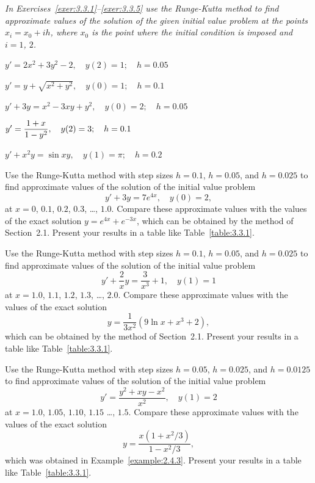 \noindent
\emph{In Exercises~\ref{exer:3.3.1}--\ref{exer:3.3.5} use the Runge-Kutta method to find approximate
values of the solution of the given initial value problem at the points $x_{i}=x_{0}+ih$, where
$x_{0}$ is the point where the initial condition is imposed and $i=1$, $2$.}

\begin{exerciselist}
  \item\label{exer:3.3.1} \Cex $y'=2x^{2}+3y^{2}-2,\quad y(2)=1;\quad h=0.05$

  \item\label{exer:3.3.2} \Cex $y'=y+\sqrt{x^{2}+y^{2}},\quad y(0)=1;\quad h=0.1$

  \item\label{exer:3.3.3} \Cex $y'+3y=x^{2}-3xy+y^{2},\quad y(0)=2;\quad h=0.05$

  \item\label{exer:3.3.4} \Cex $y'=\displaystyle\frac{1+x}{1-y^{2}},\quad y(2)=3;\quad h=0.1$

  \item\label{exer:3.3.5} \Cex $y'+x^{2}y=\sin xy,\quad y(1)=\pi;\quad h=0.2$

  \item\label{exer:3.3.6} \Cex Use the Runge-Kutta method with step sizes $h=0.1$, $h=0.05$, and
        $h=0.025$ to find approximate values of the solution of the initial value problem
  \[
    y'+3y=7e^{4x},\quad y(0)=2,
  \]
  at $x=0$, $0.1$, $0.2$, $0.3$, \dots, $1.0$. Compare these approximate values with the values of
  the exact solution $y=e^{4x}+e^{-3x}$, which can be obtained by the method of Section~2.1. Present
  your results in a table like Table~\ref{table:3.3.1}.

  \item\label{exer:3.3.7} \Cex Use the Runge-Kutta method with step sizes $h=0.1$, $h=0.05$, and
        $h=0.025$ to find approximate values of the solution of the initial value problem
  \[
    y'+\frac{2}{x}y=\frac{3}{x^{3}}+1,\quad y(1)=1
  \]
  at $x=1.0$, $1.1$, $1.2$, $1.3$, \dots, $2.0$. Compare these approximate values with the values of
  the exact solution
  \[
    y=\frac{1}{3x^{2}}(9\ln x+x^{3}+2),
  \]
  which can be obtained by the method of Section~2.1. Present your results in a table like
  Table~\ref{table:3.3.1}.

  \item\label{exer:3.3.8} \Cex Use the Runge-Kutta method with step sizes $h=0.05$, $h=0.025$, and
        $h=0.0125$ to find approximate values of the solution of the initial value problem
  \[
    y'=\frac{y^{2}+xy-x^{2}}{x^{2}},\quad y(1)=2
  \]
  at $x=1.0$, $1.05$, $1.10$, $1.15$ \dots, $1.5$. Compare these approximate values with the values
  of the exact solution
  \[
    y=\frac{x(1+x^{2}/3)}{1-x^{2}/3},
  \]
  which was obtained in Example~\ref{example:2.4.3}. Present your results in a table like
  Table~\ref{table:3.3.1}.


\end{exerciselist}
